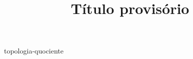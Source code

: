 \documentclass{article}
\title{Título provisório}
\theoremstyle{definition}
\theoremstyle{plain}
\theoremstyle{remark}
\begin{document}
\maketitle
{topologia-quociente}
\end{document}
